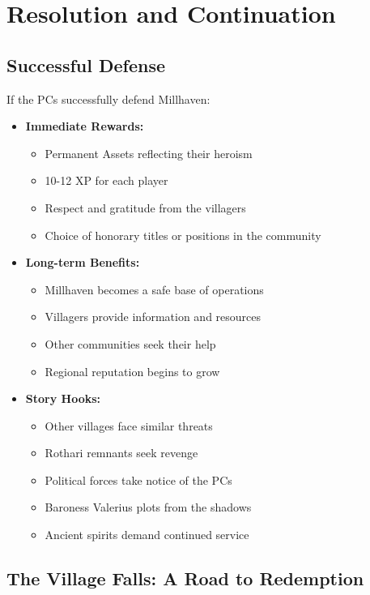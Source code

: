 \documentclass[11pt]{article}
\begin{document}
\section{Resolution and Continuation}

\subsection{Successful Defense}

If the PCs successfully defend Millhaven:
\begin{itemize}
\item \textbf{Immediate Rewards:}
   \begin{itemize}
   \item Permanent Assets reflecting their heroism
   \item 10-12 XP for each player
   \item Respect and gratitude from the villagers
   \item Choice of honorary titles or positions in the community
   \end{itemize}
\item \textbf{Long-term Benefits:}
   \begin{itemize}
   \item Millhaven becomes a safe base of operations
   \item Villagers provide information and resources
   \item Other communities seek their help
   \item Regional reputation begins to grow
   \end{itemize}
\item \textbf{Story Hooks:}
   \begin{itemize}
   \item Other villages face similar threats
   \item Rothari remnants seek revenge
   \item Political forces take notice of the PCs
   \item Baroness Valerius plots from the shadows
   \item Ancient spirits demand continued service
   \end{itemize}
\end{itemize}

\subsection{The Village Falls: A Road to Redemption}
\end{document}
